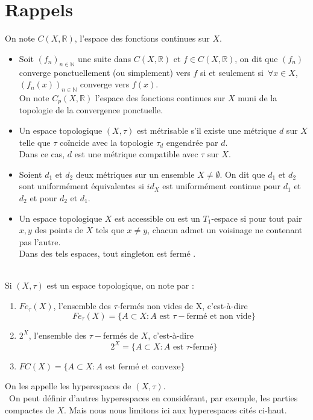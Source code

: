 \documentclass[11pt]{report}
\theoremstyle{styletheorem}
\theoremstyle{styledef}
\theoremstyle{remark}
\newcommand{\ie}{c'est-à-dire }
\newcommand{\ssi}{si et seulement si\  }
\newcommand{\R}{\ensuremath{\mathbb{R}}}
\newcommand{\N}{\ensuremath{\mathbb{N}}}
\begin{document}
\section{Rappels}
On note $C(X,\R)$, l'espace des fonctions continues sur $X$.
\begin{itemize}[label = $\bullet$]
	\item Soit $(f_n)_{n\in \N}$ une suite dans $C(X,\R)$ et $f \in C(X,\R)$, on dit que $(f_n)$ converge ponctuellement (ou simplement) vers $f$ \ssi $\forall x \in X$, $(f_n (x))_{n \in \N}$ converge vers $f(x)$.\\ 
	On note $C_p (X,\R)$ l'espace des fonctions continues sur $X$ muni de la topologie de la convergence ponctuelle.
	\item 	Un espace topologique $(X,\tau)$ est métrisable s'il existe une métrique $d$ sur $X$ telle que $\tau$ coïncide avec la topologie $\tau_d$ engendrée par $d$.\\ Dans ce cas, $d$ est une métrique compatible avec $\tau$ sur $X$.
	\item Soient $d_1$ et $d_2$ deux métriques sur un ensemble $X \neq \emptyset$. On dit que $d_1$ et $d_2$ sont uniformément équivalentes si $id_X$ est uniformément continue pour $d_1$ et $d_2$ et pour $d_2$ et $d_1$.
	\item Un espace topologique $X$ est accessible ou est un $T_1$-espace si pour tout pair $x,y$ des points de $X$ tels que $x\neq y$, chacun 	admet un voisinage ne contenant pas l'autre. \\
	Dans des tels espaces, tout singleton est fermé \cite{b9}.
	
\end{itemize}
\ \\
Si $(X,\tau)$ est un espace topologique, on note par : 
\begin{enumerate}[label = $\bullet$]
	\item $Fe_{\tau}(X)$, l'ensemble des $\tau$-fermés non vides de X, \ie $$Fe_{\tau}(X) = \lbrace A \subset X :  A \text{ est }  \tau-\text{fermé et non vide} \rbrace$$
	\item $2^X$, l'ensemble des $\tau-$fermés de $X$, \ie $$2^X = \lbrace A \subset X \colon  A \text{ est $\tau$-fermé} \rbrace$$
	\item $FC(X) = \lbrace A \subset X \colon  A \text{ est fermé et convexe} \rbrace$ 
\end{enumerate}
On les appelle les hyperespaces de $(X, \tau)$.\\ \
On peut définir d'autres hyperespaces en considérant, par exemple,  les parties compactes de $X$. Mais nous nous limitons ici aux hyperespaces cités ci-haut.	
\end{document}
